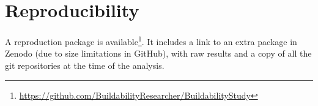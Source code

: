 % 

\section*{Reproducibility}
\label{sec:buildability:repro}

A reproduction package is available\footnote{\url{https://github.com/BuildabilityResearcher/BuildabilityStudy}}. It includes a link to an extra package in Zenodo (due to size limitations in GitHub), with raw results and a copy of all the git repositories at the time of the analysis.
